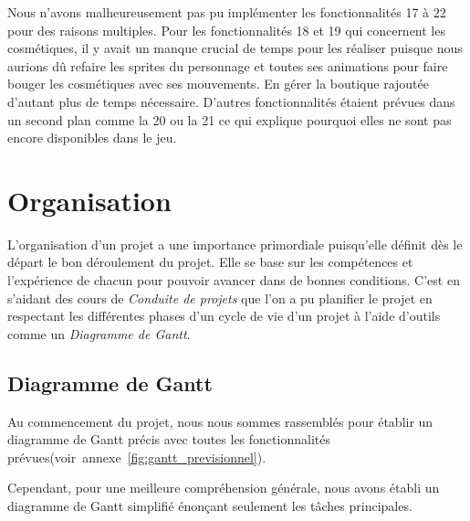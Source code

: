 \documentclass{article}
\begin{document}
Nous n'avons malheureusement pas pu implémenter les fonctionnalités 17 à 22 pour des raisons multiples. Pour les fonctionnalités 18 et 19 qui concernent les cosmétiques, il y avait un manque crucial de temps pour les réaliser puisque nous aurions dû refaire les sprites du personnage et toutes ses animations pour faire bouger les cosmétiques avec ses mouvements. En gérer la boutique rajoutée d'autant plus de temps nécessaire. D'autres fonctionnalités étaient prévues dans un second plan comme la 20 ou la 21 ce qui explique pourquoi elles ne sont pas encore disponibles dans le jeu.  

\newpage

\section{Organisation} %

L'organisation d'un projet a une importance primordiale puisqu'elle définit dès le départ le bon déroulement du projet. Elle se base sur les compétences et l'expérience de chacun pour pouvoir avancer dans de bonnes conditions. C'est en s'aidant des cours de \textit{Conduite de projets} que l'on a pu planifier le projet en respectant les différentes phases d'un cycle de vie d'un projet à l'aide d'outils comme un \textit{Diagramme de Gantt}.

\subsection{Diagramme de Gantt}

Au commencement du projet, nous nous sommes rassemblés pour établir un diagramme de Gantt précis avec toutes les fonctionnalités prévues(voir~annexe~\ref{fig:gantt_previsionnel}).

Cependant, pour une meilleure compréhension générale, nous avons établi un diagramme de Gantt simplifié énonçant seulement les tâches principales.
\end{document}
